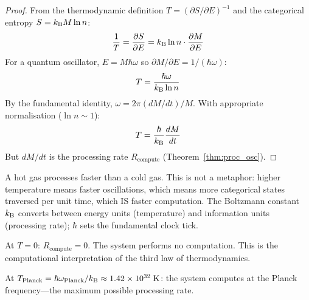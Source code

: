 \begin{proof}
From the thermodynamic definition $T = (\partial S / \partial E)^{-1}$ and the categorical entropy $S = k_{\mathrm{B}} M \ln n$:
\begin{equation}
    \frac{1}{T} = \frac{\partial S}{\partial E} = k_{\mathrm{B}} \ln n \cdot \frac{\partial M}{\partial E}
\end{equation}
For a quantum oscillator, $E = M\hbar\omega$ so $\partial M/\partial E = 1/(\hbar\omega)$:
\begin{equation}
    T = \frac{\hbar\omega}{k_{\mathrm{B}} \ln n}
\end{equation}
By the fundamental identity, $\omega = 2\pi(dM/dt)/M$. With appropriate normalisation ($\ln n \sim 1$):
\begin{equation}
    T = \frac{\hbar}{k_{\mathrm{B}}}\frac{dM}{dt}
\end{equation}
But $dM/dt$ is the processing rate $R_{\mathrm{compute}}$ (Theorem~\ref{thm:proc_osc}).
\end{proof}

\begin{remark}
A hot gas processes faster than a cold gas. This is not a metaphor: higher temperature means faster oscillations, which means more categorical states traversed per unit time, which IS faster computation. The Boltzmann constant $k_{\mathrm{B}}$ converts between energy units (temperature) and information units (processing rate); $\hbar$ sets the fundamental clock tick.
\end{remark}

\begin{corollary}
At $T = 0$: $R_{\mathrm{compute}} = 0$. The system performs no computation. This is the computational interpretation of the third law of thermodynamics.
\end{corollary}

\begin{corollary}
At $T_{\mathrm{Planck}} = \hbar\omega_{\mathrm{Planck}}/k_{\mathrm{B}} \approx 1.42 \times 10^{32}\;\mathrm{K}$: the system computes at the Planck frequency---the maximum possible processing rate.
\end{corollary}

